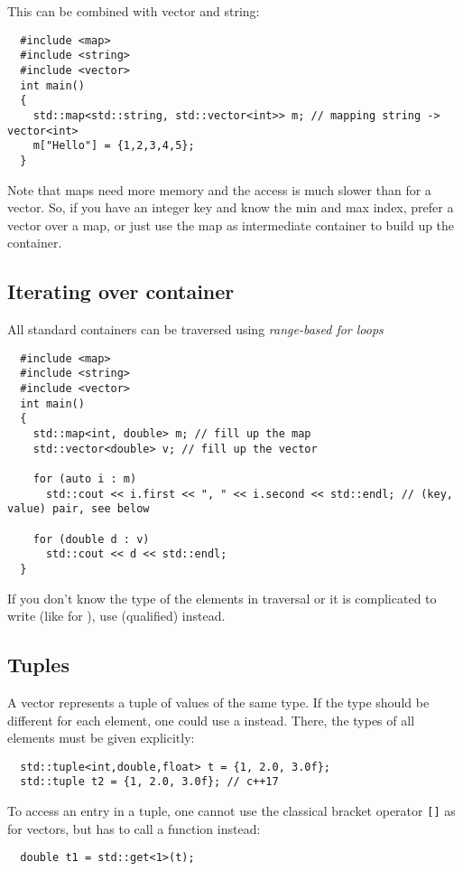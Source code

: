 This can be combined with vector and string:
\begin{verbatim}
  #include <map>
  #include <string>
  #include <vector>
  int main()
  {
    std::map<std::string, std::vector<int>> m; // mapping string -> vector<int>
    m["Hello"] = {1,2,3,4,5};
  }
\end{verbatim}

\begin{rem}
  Note that maps need more memory and the access is much slower than for a vector. So, if you have an integer key and know the min and max index, prefer a vector over a map, or just use the map as intermediate container to build up the container.
\end{rem}

\subsection{Iterating over container}
All standard containers can be traversed using \emph{range-based for loops}
\begin{verbatim}
  #include <map>
  #include <string>
  #include <vector>
  int main()
  {
    std::map<int, double> m; // fill up the map
    std::vector<double> v; // fill up the vector

    for (auto i : m)
      std::cout << i.first << ", " << i.second << std::endl; // (key, value) pair, see below

    for (double d : v)
      std::cout << d << std::endl;
  }
\end{verbatim}
If you don't know the type of the elements in traversal or it is complicated to write (like for ), use (qualified)  instead.

\subsection{Tuples}
A vector represents a tuple of values of the same type. If the type should be different for each element, one could use a  instead. There, the types of all elements must be given
explicitly:
%
\begin{verbatim}
  std::tuple<int,double,float> t = {1, 2.0, 3.0f};
  std::tuple t2 = {1, 2.0, 3.0f}; // c++17
\end{verbatim}
%
To access an entry in a tuple, one cannot use the classical bracket operator \texttt{[]} as for vectors, but has to call a function instead:
%
\begin{verbatim}
  double t1 = std::get<1>(t);
\end{verbatim}

